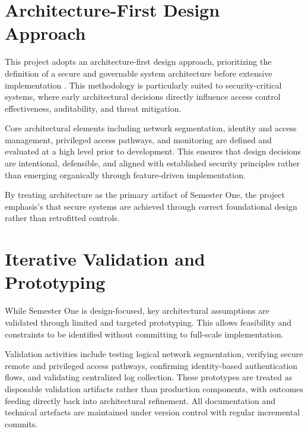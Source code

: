\section{Architecture-First Design Approach}

This project adopts an architecture-first design approach, prioritizing the definition of a
secure and governable system architecture before extensive implementation \cite{sommervilleESP}. This
methodology is particularly suited to security-critical systems, where early architectural
decisions directly influence access control effectiveness, auditability, and threat
mitigation.

Core architectural elements including network segmentation, identity and access
management, privileged access pathways, and monitoring are defined and evaluated at
a high level prior to development. This ensures that design decisions are intentional,
defensible, and aligned with established security principles rather than emerging
organically through feature-driven implementation.

By treating architecture as the primary artifact of Semester One, the project emphasis's
that secure systems are achieved through correct foundational design rather than
retrofitted controls.


\section{Iterative Validation and Prototyping}

While Semester One is design-focused, key architectural assumptions are validated
through limited and targeted prototyping. This allows feasibility and constraints to be
identified without committing to full-scale implementation.

Validation activities include testing logical network segmentation, verifying secure
remote and privileged access pathways, confirming identity-based authentication flows,
and validating centralized log collection. These prototypes are treated as disposable
validation artifacts rather than production components, with outcomes feeding directly
back into architectural refinement. All documentation and technical artefacts are maintained under version control with regular incremental commits.
